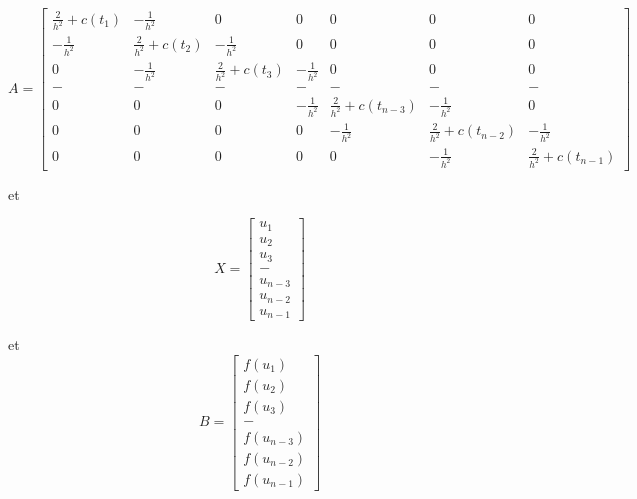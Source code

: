 \documentclass[12pt, letterpaper]{article}
\begin{document}
\begin{enumerate}
  \begin{equation*}
    A =
    \left[
    \begin{array}{lllllll}
      \frac{2}{h^2} + c(t_1) & - \frac{1}{h^2} & 0 & 0 & 0 & 0 & 0 \\
      - \frac{1}{h^2} & \frac{2}{h^2} + c(t_2) & - \frac{1}{h^2} & 0 &
      0 & 0 & 0 \\
      0 & - \frac{1}{h^2} & \frac{2}{h^2} + c(t_3) & - \frac{1}{h^2} &
      0 & 0 & 0 \\
      - & - & - & - & - & - & - \\
      0 & 0 & 0 &- \frac{1}{h^2} & \frac{2}{h^2} + c(t_{n-3}) & - \frac{1}{h^2} &
      0 \\
      0 & 0 & 0 & 0 &- \frac{1}{h^2} & \frac{2}{h^2} + c(t_{n-2}) & - \frac{1}{h^2} \\
      0 & 0 & 0 & 0 & 0 &- \frac{1}{h^2} & \frac{2}{h^2} + c(t_{n-1})
    \end{array}
    \right]
  \end{equation*}

  et
  
  \begin{equation*}
    X =
    \left[
      \begin{array}{l}
        u_1 \\
        u_2 \\
        u_3 \\
        - \\
        u_{n-3} \\
        u_{n-2} \\
        u_{n-1}
      \end{array}
      \right]
  \end{equation*}

  et
    \begin{equation*}
      B =
      \left[
        \begin{array}{l}
          f(u_1) \\
          f(u_2) \\
          f(u_3) \\
          - \\
          f(u_{n-3}) \\
          f(u_{n-2}) \\
          f(u_{n-1})
        \end{array}
        \right]
    \end{equation*}


\end{enumerate}
\end{document}

